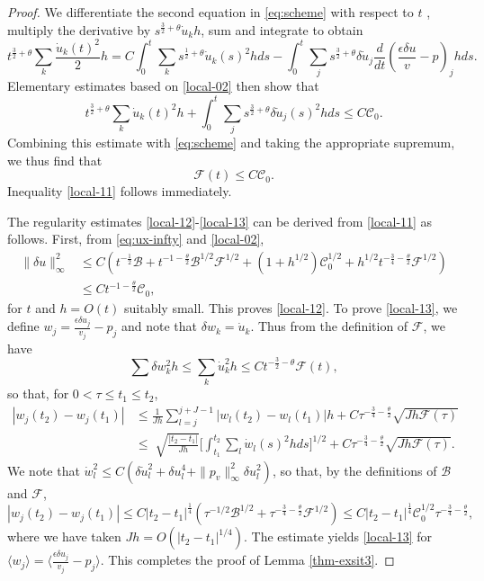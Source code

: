 \documentclass[a4paper,oneside,11pt]{article}
\numberwithin{equation}{section}
\begin{document}
\begin{proof}
We differentiate the second equation in \eqref{eq:scheme} with respect to \(t\) , multiply the derivative by \(s^{\frac32+\theta}\dot{u}_kh\), sum and integrate to obtain
\[t^{\frac{3}{2}+\theta}\sum_{k}\frac{\dot{u}_{k}(t)^{2}}{2}h=C\int_{0}^{t}\sum_{k}s^{\frac{1}{2}+\theta}\dot{u}_{k}(s)^{2}hds-\int_{0}^{t}\sum_{j}s^{\frac{3}{2}+\theta}\delta\dot{u}_{j}\frac{d}{dt}\left(\frac{\epsilon\delta u}{v}-p\right)_{j}hds.\]
Elementary estimates based on \eqref{local-02} then show that
\[t^{\frac{3}{2}+\theta}\sum_{k}\dot{u}_{k}(t)^{2}h+\int_{0}^{t}\sum_{j}s^{\frac{3}{2}+\theta}\delta\dot{u}_{j}(s)^{2}hds\leq C\mathscr{C}_0.\]
Combining this estimate with \eqref{eq:scheme} and taking the appropriate supremum, we thus find that
\[\mathscr{F}(t)\leq C\mathscr{C}_0.\]
Inequality \eqref{local-11} follows immediately.

The regularity estimates \eqref{local-12}-\eqref{local-13} can be derived from \eqref{local-11} as follows. 
First, from \eqref{eq:ux-infty} and \eqref{local-02},
\[\begin{aligned}
\|\delta u\|_{\infty}^{2}& \leq C\left(t^{-\frac{1}{2}}\mathscr{B}+t^{-1-\frac{\theta}{2}}\mathscr{B}^{1/2}\mathscr{F}^{1/2}+(1+h^{1/2})\mathscr{C}_0^{1/2}+h^{1/2}t^{-\frac34-\frac{\theta}{2}}\mathscr{F}^{1/2}\right) \\
&\leq Ct^{-1-\frac{\theta}{2}}\mathscr{C}_{0},
\end{aligned}\]
for \(t\) and \(h=O(t)\) suitably small. This proves \eqref{local-12}. 
To prove \eqref{local-13}, we define \(w_j= \frac{\epsilon\delta u_{j}}{v_{j}}-p_{j}\) and note that \(\delta w_k=\dot{u}_k\). Thus from the definition of \(\mathscr{F}\), we have
\[\sum\delta w_{k}^{2}h\leq\sum_{k}\dot{u}_{k}^{2}h\leq Ct^{-\frac{3}{2}-\theta}\mathscr{F}(t),\]
so that, for \(0<\tau\leq t_{1}\leq t_{2}\),
\[\begin{aligned}
|w_{j}(t_{2})-w_{j}(t_{1})|& \leq\frac{1}{Jh}\sum_{l=j}^{j+J-1}\left|w_{l}(t_{2})-w_{l}(t_{1})\right|h+C\tau^{-\frac{3}{4}-\frac{\theta}{2}}\sqrt{Jh\mathscr{F}(\tau)} \\
&\leq\sqrt[]{\frac{|t_{2}-t_{1}|}{Jh}}\biggl[\int_{t_{1}}^{t_{2}}\sum_{l}\dot{w}_{l}(s)^{2}hds\biggr]^{1/2}+C\tau^{-\frac{3}{4}-\frac{\theta}{2}}\sqrt{Jh{\mathcal F}(\tau)}.
\end{aligned}\]
We note that
\(\dot{w}_{l}^{2}\leq C(\delta\dot{u}_{l}^{2}+\delta u_{l}^{4}+\|p_{v}\|_{\infty}^{2}\delta u_{l}^{2})\), so that, by the definitions of $\mathscr{B}$ and $\mathscr{F}$,
\[\left|w_j(t_2)-w_j(t_1)\right|\leq C\left|t_2-t_1\right|^{\frac14}\left(\tau^{-1/2}\mathscr{B}^{1/2}+\tau^{-\frac{3}{4}-\frac{\theta}{2}}\mathscr{F}^{1/2}\right)\leq C\left|t_2-t_1\right|^{\frac14}\mathscr{C}_0^{1/2}\tau^{-\frac{3}{4}-\frac{\theta}{2}},\]
where we have taken \(Jh=O(|t_{2}-t_{1}|^{1/4})\). The estimate yields \eqref{local-13} for \(\langle w_j\rangle =\big\langle\frac{\epsilon\delta u_{j}}{v_{j}}-p_{j}\big\rangle\). This completes the proof of Lemma \ref{thm-exsit3}.
\end{proof}
\end{document}
